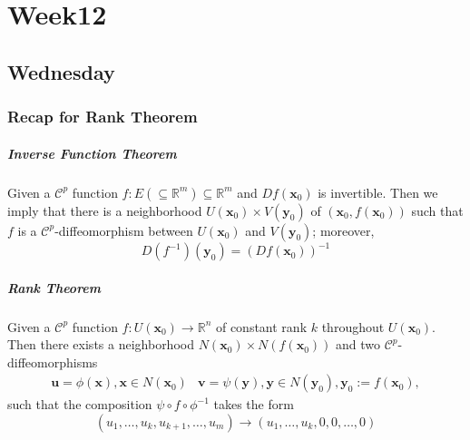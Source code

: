 
\chapter{Week12}
\section{Wednesday}
\subsection{Recap for Rank Theorem}
\paragraph{Inverse Function Theorem}
Given a $\mathcal{C}^p$ function $f:E(\subseteq\mathbb{R}^m)\subseteq\mathbb{R}^m$ and $Df(\bm x_0)$ is invertible. Then we imply that there is a neighborhood $U(\bm x_0)\times V(\bm y_0)$ of $(\bm x_0,f(\bm x_0))$ such that $f$ is a $\mathcal{C}^p$-diffeomorphism between $U(\bm x_0)$ and $V(\bm y_0)$; moreover,
\[
D(f^{-1})(\bm y_0)=(Df(\bm x_0))^{-1}
\]

\paragraph{Rank Theorem}
Given a $\mathcal{C}^p$ function $f:U(\bm x_0)\to\mathbb{R}^n$ of constant rank $k$ throughout $U(\bm x_0)$. Then there exists a neighborhood $N(\bm x_0)\times N(f(\bm x_0))$ and two $\mathcal{C}^p$-diffeomorphisms
\[
\begin{array}{ll}
\bm u=\phi(\bm x), \bm x\in N(\bm x_0)
&
\bm v=\psi(\bm y), \bm y\in N(\bm y_0), \bm y_0:=f(\bm x_0),
\end{array}
\]
such that the composition $\psi\circ f\circ\phi^{-1}$ takes the form
\[
(u_1,\dots,u_k,u_{k+1},\dots,u_m)\to
(u_1,\dots,u_k,0,0,\dots,0)
\]
